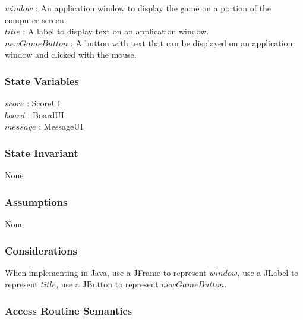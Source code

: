 \documentclass[12pt]{article}
\begin{document}
$window$ : An application window to display the game on a portion of the computer screen. \\
$title$ : A label to display text on an application window. \\
$newGameButton$ : A button with text that can be displayed on an application window and clicked with the mouse. 

\subsubsection* {State Variables}

$score$ : ScoreUI \\
$board$ : BoardUI \\
$message$ : MessageUI

\subsubsection* {State Invariant}

None

\subsubsection* {Assumptions}

None

\subsubsection* {Considerations}

When implementing in Java, use a JFrame to represent $window$, use a JLabel to represent $title$, use a JButton to represent $newGameButton$. 
\newpage

\subsubsection* {Access Routine Semantics}
\end{document}
